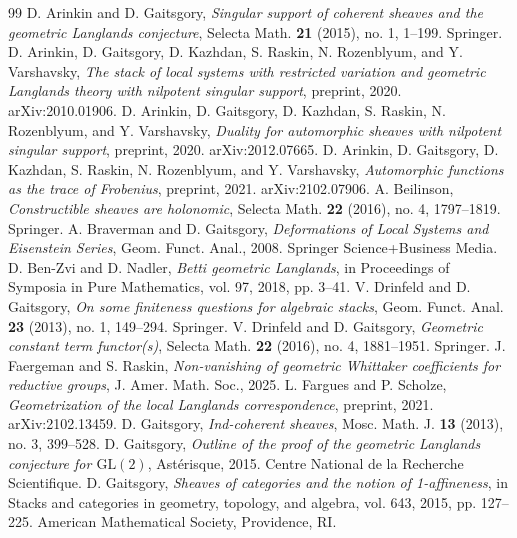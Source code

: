 \begin{thebibliography}{99}
 D. Arinkin and D. Gaitsgory, \emph{Singular support of coherent sheaves and the geometric Langlands conjecture}, Selecta Math. \textbf{21} (2015), no. 1, 1--199. Springer.
 D. Arinkin, D. Gaitsgory, D. Kazhdan, S. Raskin, N. Rozenblyum, and Y. Varshavsky, \emph{The stack of local systems with restricted variation and geometric Langlands theory with nilpotent singular support}, preprint, 2020. arXiv:2010.01906.
 D. Arinkin, D. Gaitsgory, D. Kazhdan, S. Raskin, N. Rozenblyum, and Y. Varshavsky, \emph{Duality for automorphic sheaves with nilpotent singular support}, preprint, 2020. arXiv:2012.07665.
 D. Arinkin, D. Gaitsgory, D. Kazhdan, S. Raskin, N. Rozenblyum, and Y. Varshavsky, \emph{Automorphic functions as the trace of Frobenius}, preprint, 2021. arXiv:2102.07906.
 A. Beilinson, \emph{Constructible sheaves are holonomic}, Selecta Math. \textbf{22} (2016), no. 4, 1797--1819. Springer.
 A. Braverman and D. Gaitsgory, \emph{Deformations of Local Systems and Eisenstein Series}, Geom. Funct. Anal., 2008. Springer Science+Business Media.
 D. Ben-Zvi and D. Nadler, \emph{Betti geometric Langlands}, in Proceedings of Symposia in Pure Mathematics, vol. 97, 2018, pp. 3--41.
 V. Drinfeld and D. Gaitsgory, \emph{On some finiteness questions for algebraic stacks}, Geom. Funct. Anal. \textbf{23} (2013), no. 1, 149--294. Springer.
 V. Drinfeld and D. Gaitsgory, \emph{Geometric constant term functor(s)}, Selecta Math. \textbf{22} (2016), no. 4, 1881--1951. Springer.
 J. Faergeman and S. Raskin, \emph{Non-vanishing of geometric Whittaker coefficients for reductive groups}, J. Amer. Math. Soc., 2025.
 L. Fargues and P. Scholze, \emph{Geometrization of the local Langlands correspondence}, preprint, 2021. arXiv:2102.13459.
 D. Gaitsgory, \emph{Ind-coherent sheaves}, Mosc. Math. J. \textbf{13} (2013), no. 3, 399--528.
 D. Gaitsgory, \emph{Outline of the proof of the geometric Langlands conjecture for $\mathrm{GL}(2)$}, Ast\'erisque, 2015. Centre National de la Recherche Scientifique.
 D. Gaitsgory, \emph{Sheaves of categories and the notion of 1-affineness}, in Stacks and categories in geometry, topology, and algebra, vol. 643, 2015, pp. 127--225. American Mathematical Society, Providence, RI.

\end{thebibliography}
